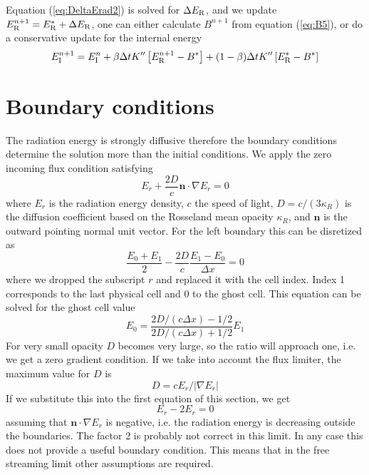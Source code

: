 \documentclass[12pt]{article}
\newcommand{\Eint}{E_{\rm I}}
\newcommand{\Erad}{E_{\rm R}}
\begin{document}
Equation (\ref{eq:DeltaErad2}) is solved for $\Delta \Erad$,
and we update $\Erad^{n+1} = \Erad^* + \Delta \Erad$, one can 
either calculate $B^{n+1}$ from equation (\ref{eq:B5}), 
or do a conservative update for the internal energy
\begin{equation}
  \Eint^{n+1} = \Eint^n + \beta \Delta t K''\left[\Erad^{n+1} - B^*\right]
                        + (1-\beta) \Delta t K''\left[\Erad^* - B^*\right]
\end{equation}

\section{Boundary conditions}

The radiation energy is strongly diffusive therefore the boundary conditions determine 
the solution more than the initial conditions. We apply the zero incoming flux condition
satisfying
\begin{equation}
   E_r + \frac{2 D}{c}\mathbf{n} \cdot \nabla E_r = 0
\end{equation}
where $E_r$ is the radiation energy density, $c$ the speed of light, 
$D=c/(3\kappa_R)$ is the diffusion coefficient based on the Rosseland mean
opacity $\kappa_R$, and $\mathbf{n}$ is the outward pointing normal unit vector. 
For the left boundary this can be disretized as
\begin{equation}
   \frac{E_0 + E_1}{2} - \frac{2 D}{c}\frac{E_1 - E_0}{\Delta x} = 0
\end{equation}
where we dropped the subscript $r$ and replaced it with the cell index. 
Index 1 corresponds to the last physical cell and 0 to the ghost cell. 
This equation can be solved for the ghost cell value
\begin{equation}
  E_0 = \frac{ 2D/(c\Delta x) - 1/2}{ 2D/(c\Delta x) + 1/2} E_1 
\end{equation}
For very small opacity $D$ becomes very large, so the ratio will approach one, 
i.e. we get a zero gradient condition. If we take into account the flux limiter,
the maximum value for $D$ is 
\begin{equation}
  D = c E_r / |\nabla E_r|
\end{equation}
If we substitute this into the first equation of this section, we get
\begin{equation}
   E_r - 2 E_r = 0
\end{equation}
assuming that $\mathbf{n} \cdot \nabla E_r$ is negative, i.e. the radiation
energy is decreasing outside the boundaries. The factor 2 is probably not
correct in this limit. In any case this does not provide a useful boundary
condition. This means that in the free streaming limit other assumptions are
required.
\end{document}
